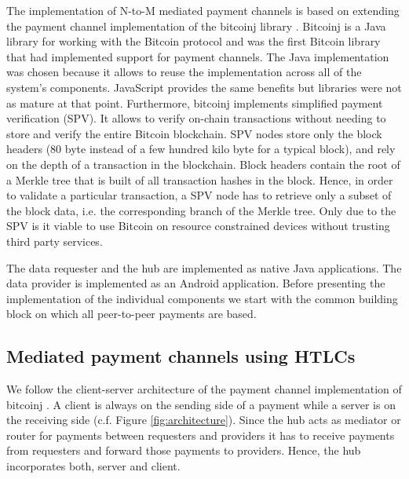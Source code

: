 The implementation of N-to-M mediated payment channels is based on extending the payment channel implementation of the bitcoinj library \cite{Bitcoinj}. Bitcoinj is a Java library for working with the Bitcoin protocol and was the first Bitcoin library that had implemented support for payment channels. The Java implementation was chosen because it allows to reuse the implementation across all of the system's components. JavaScript provides the same benefits but libraries were not as mature at that point. Furthermore, bitcoinj implements simplified payment verification (SPV). It allows to verify on-chain transactions without needing to store and verify the entire Bitcoin blockchain. SPV nodes store only the block headers (80 byte instead of a few hundred kilo byte for a typical block), and rely on the depth of a transaction in the blockchain. Block headers contain the root of a Merkle tree that is built of all transaction hashes in the block. Hence, in order to validate a particular transaction, a SPV node has to retrieve only a subset of the block data, i.e. the corresponding branch of the Merkle tree.
Only due to the SPV is it viable to use Bitcoin on resource constrained devices without trusting third party services.

The data requester and the hub are implemented as native Java applications. The data provider is implemented as an Android application. Before presenting the implementation of the individual components we start with the common building block on which all peer-to-peer payments are based. 

\subsection{Mediated payment channels using HTLCs}

We follow the client-server architecture of the payment channel implementation of bitcoinj \cite{BitcoinjPC}. A client is always on the sending side of a payment while a server is on the receiving side (c.f. Figure \ref{fig:architecture}). Since the hub acts as mediator or router for payments between requesters and providers it has to receive payments from requesters and forward those payments to providers. Hence, the hub incorporates both, server and client.

